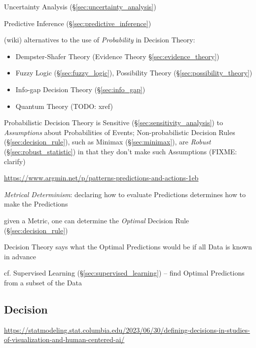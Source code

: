 \fist Uncertainty Analysis (\S\ref{sec:uncertainty_analysis})

\fist Predictive Inference (\S\ref{sec:predictive_inference})

(wiki) alternatives to the use of \emph{Probability} in Decision Theory:
\begin{itemize}
  \item Dempster-Shafer Theory (Evidence Theory \S\ref{sec:evidence_theory})
  \item Fuzzy Logic (\S\ref{sec:fuzzy_logic}), Possibility Theory
    (\S\ref{sec:possibility_theory})
  \item Info-gap Decision Theory (\S\ref{sec:info_gap})
  \item Quantum Theory (TODO: xref)
\end{itemize}
Probabilistic Decision Theory is Sensitive (\S\ref{sec:sensitivity_analysis}) to
\emph{Assumptions} about Probabilities of Events; Non-probabilistic Decision
Rules (\S\ref{sec:decision_rule}), such as Minimax (\S\ref{sec:minimax}), are
\emph{Robust} (\S\ref{sec:robust_statistic}) in that they don't make such
Assumptions (FIXME: clarify)

\asterism

\url{https://www.argmin.net/p/patterns-predictions-and-actions-1eb}

\emph{Metrical Determinism}: declaring how to evaluate Predictions determines
how to make the Predictions

given a Metric, one can determine the \emph{Optimal} Decision Rule
(\S\ref{sec:decision_rule})

Decision Theory says what the Optimal Predictions would be if all Data is known
in advance

\fist cf. Supervised Learning (\S\ref{sec:supervised_learning}) -- find Optimal
Predictions from a subset of the Data



\subsection{Decision}\label{sec:decision}

\url{https://statmodeling.stat.columbia.edu/2023/06/30/defining-decisions-in-studies-of-visualization-and-human-centered-ai/}



